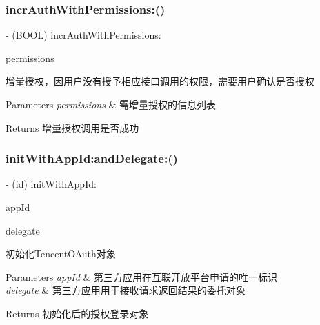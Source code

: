 \subsubsection{\texorpdfstring{incr\+Auth\+With\+Permissions\+:()}{incrAuthWithPermissions:()}\hspace{0.1cm}{\footnotesize\ttfamily [2/2]}}
{\footnotesize\ttfamily -\/ (B\+O\+OL) incr\+Auth\+With\+Permissions\+: \begin{DoxyParamCaption}\item[{(N\+S\+Array $\ast$)}]{permissions }\end{DoxyParamCaption}}

增量授权，因用户没有授予相应接口调用的权限，需要用户确认是否授权 
\begin{DoxyParams}{Parameters}
{\em permissions} & 需增量授权的信息列表 \\
\hline
\end{DoxyParams}
\begin{DoxyReturn}{Returns}
增量授权调用是否成功 
\end{DoxyReturn}
\mbox{\label{interface_tencent_o_auth_ab9fec0e89d909e69750911ce59d0d7f4}} 
\subsubsection{\texorpdfstring{init\+With\+App\+Id\+:and\+Delegate\+:()}{initWithAppId:andDelegate:()}\hspace{0.1cm}{\footnotesize\ttfamily [1/2]}}
{\footnotesize\ttfamily -\/ (id) init\+With\+App\+Id\+: \begin{DoxyParamCaption}\item[{(N\+S\+String $\ast$)}]{app\+Id }\item[{andDelegate:(id$<$ \mbox{\hyperlink{protocol_tencent_session_delegate-p}{Tencent\+Session\+Delegate}} $>$)}]{delegate }\end{DoxyParamCaption}}

初始化\+Tencent\+O\+Auth对象 
\begin{DoxyParams}{Parameters}
{\em app\+Id} & 第三方应用在互联开放平台申请的唯一标识 \\
\hline
{\em delegate} & 第三方应用用于接收请求返回结果的委托对象 \\
\hline
\end{DoxyParams}
\begin{DoxyReturn}{Returns}
初始化后的授权登录对象 
\end{DoxyReturn}
\mbox{\label{interface_tencent_o_auth_ab9fec0e89d909e69750911ce59d0d7f4}} 
